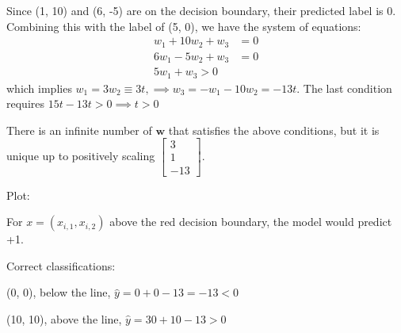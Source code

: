 \documentclass[a4paper, 12pt]{article}
\begin{document}
\begin{problem}
\end{problem}
\begin{solution}
    Since (1, 10) and (6, -5) are on the decision boundary, their predicted label is 0. Combining this with the label of (5, 0), we have the system of equations:
    \begin{align*}
        w_1 + 10 w_2 + w_3 & = 0 \\
        6 w_1 - 5w_2 + w_3 & = 0 \\
        5 w_1 + w_3 > 0
    \end{align*}
    which implies $w_1 = 3w_2 \equiv 3t, \implies w_3 = -w_1 - 10w_2 = -13t$. The last condition requires $15t - 13t > 0 \implies t > 0$

    There is an infinite number of $\mathbf{w}$ that satisfies the above conditions, but it is unique up to positively scaling $\begin{bmatrix}
            3 \\
            1 \\
            -13
        \end{bmatrix}$.

    Plot:
    \begin{center}
    \end{center}

    For $x = (x_{i, 1}, x_{i, 2})$ above the red decision boundary, the model would predict +1.

    Correct classifications:

    (0, 0), below the line, $\hat{y} = 0 + 0 - 13  = -13 < 0$

    (10, 10), above the line, $\hat{y} = 30 + 10 - 13 > 0$

\end{solution}
\end{document}
